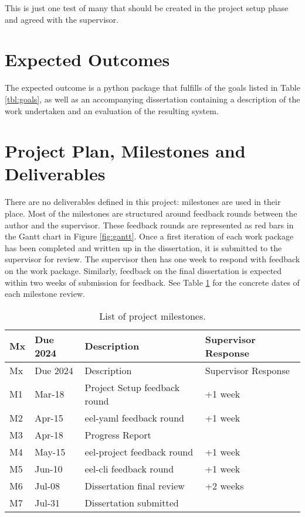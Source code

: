This is just one test of many that should be created in the project
setup phase and agreed with the supervisor.

\section{Expected Outcomes}\label{expected-outcomes}

The expected outcome is a python package that fulfills of the goals
listed in Table \ref{tbl:goals}, as well as an accompanying dissertation
containing a description of the work undertaken and an evaluation of the
resulting system.

\section{Project Plan, Milestones and
Deliverables}\label{project-plan-milestones-and-deliverables}

There are no deliverables defined in this project: milestones are used
in their place. Most of the milestones are structured around feedback
rounds between the author and the supervisor. These feedback rounds are
represented as red bars in the Gantt chart in Figure \ref{fig:gantt}.
Once a first iteration of each work package has been completed and
written up in the dissertation, it is submitted to the supervisor for
review. The supervisor then has one week to respond with feedback on the
work package. Similarly, feedback on the final dissertation is expected
within two weeks of submission for feedback. See Table \ref{tbl:del} for
the concrete dates of each milestone review.



\begin{longtable}[]{@{}llll@{}}
\caption{\label{tbl:del}List of project milestones.}\tabularnewline
\toprule\noalign{}
Mx & Due 2024 & Description & Supervisor Response \\
\midrule\noalign{}
\endfirsthead
\toprule\noalign{}
Mx & Due 2024 & Description & Supervisor Response \\
\midrule\noalign{}
\endhead
\bottomrule\noalign{}
\endlastfoot
M1 & Mar-18 & Project Setup feedback round & +1 week \\
M2 & Apr-15 & eel-yaml feedback round & +1 week \\
M3 & Apr-18 & Progress Report & \\
M4 & May-15 & eel-project feedback round & +1 week \\
M5 & Jun-10 & eel-cli feedback round & +1 week \\
M6 & Jul-08 & Dissertation final review & +2 weeks \\
M7 & Jul-31 & Dissertation submitted & \\
\end{longtable}
